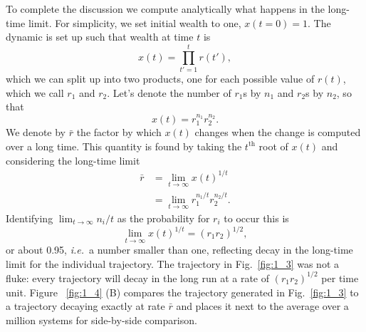 \documentclass[a4paper]{article}
\newcommand{\ie}{{\it i.e.}\ }
\newcommand{\fref}[1]{Fig.~\ref{fig:#1}}
\newcommand{\Fref}[1]{Figure ~\ref{fig:#1}}
\newcommand{\be}{\begin{equation}}
\newcommand{\ee}{\end{equation}}
\newcommand{\bea}{\begin{eqnarray}}
\newcommand{\eea}{\end{eqnarray}}
\begin{document}
To complete the discussion we compute analytically what happens in the long-time limit.
For simplicity, we set initial wealth to one, $x(t=0)=1$. The dynamic is set up such that 
wealth at time $t$ is
\be
x(t)=\prod_{t'=1}^t r(t'),
\ee
which we can split up into two products, one for each possible value of $r(t)$, which we call
$r_1$ and $r_2$. Let's denote the number of $r_1$s by $n_1$ and $r_2$s by $n_2$, 
so that
\be
x(t)= r_1^{n_1} r_2^{n_2}.
\ee
We denote by $\bar{r}$ the factor by which $x(t)$ changes when the change is computed over a long time. 
This quantity is found by taking the $t^{\text{th}}$ root of $x(t)$ and considering the long-time limit
\bea
\bar{r} &=\lim_{t\to\infty }x(t)^{1/t}\\
 &= \lim_{t\to\infty } r_1^{n_1/t} r_2^{n_2/t}.
\eea
Identifying $\lim_{t\to\infty} n_i/t$ as the probability for $r_i$ to occur this is
\be
\lim_{t\to\infty }x(t)^{1/t}= (r_1 r_2)^{1/2},
\ee
or about 0.95, \ie a number smaller than one, reflecting 
decay in the long-time limit for the individual trajectory.
The trajectory in \fref{1_3} was not a fluke: every trajectory
will decay in the long run at a rate of $(r_1 r_2)^{1/2}$ per time unit. \Fref{1_4} (B) 
compares the trajectory generated in \fref{1_3} to a trajectory decaying exactly 
at rate $\bar{r}$
and places it next to the average over a million systems for side-by-side comparison.
\end{document}
